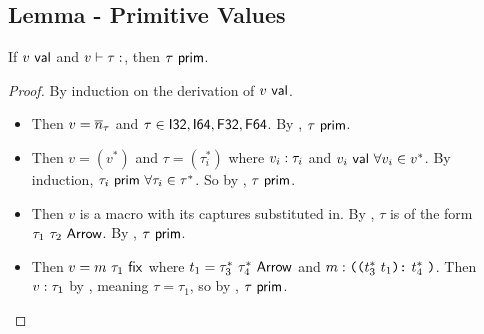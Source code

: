 \documentclass{article}
\begin{document}
\subsection{Lemma - Primitive Values}
If $v ~\mathsf{val}$ and $\typed{v}{\tau}$, then $\tau ~\mathsf{prim}$.
\begin{proof}
By induction on the derivation of $v ~\mathsf{val}$.
\begin{itemize}
    \item {}
        Then $v = \overline{n}_\tau$ and $\tau \in {\ensuremath{\mathsf{I32}}, \ensuremath{\mathsf{I64}}, \ensuremath{\mathsf{F32}}, \ensuremath{\mathsf{F64}}}$. By , $\tau ~\mathsf{prim}$.

    \item {}
        Then $v = (v^*)$ and $\tau = (\tau_i^*)$ where $v_i : \tau_i$ and $v_i ~\mathsf{val}~ \forall v_i \in v^*$.
        By induction, $\tau_i ~\mathsf{prim}~ \forall \tau_i \in \tau^*$.
        So by , $\tau ~\mathsf{prim}$.
    
    \item {}
        Then $v$ is a macro with its captures substituted in.
        By , $\tau$ is of the form $\tau_1 ~ \tau_2 ~ \mathsf{Arrow}$.
        By , $\tau ~\mathsf{prim}$.
    
    \item {}
        Then $v = m ~ \tau_1 ~ \mathsf{fix}$ where $t_1 = \tau_3^* ~ \tau_4^* ~ \mathsf{Arrow}$ and $m : \texttt{((} t_3^* ~ t_1 \texttt{):} ~ t_4^* ~ \texttt{)}$.
        Then $v : \tau_1$ by , meaning $\tau = \tau_1$, so by , $\tau ~\mathsf{prim}$.
\end{itemize}
\end{proof}
\end{document}
